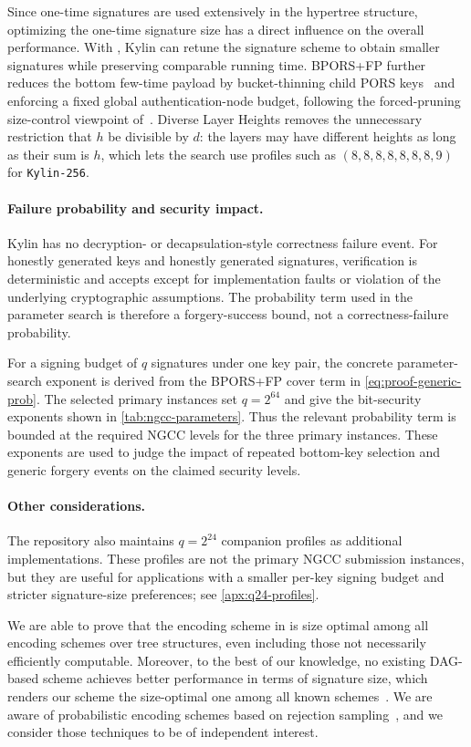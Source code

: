 Since one-time signatures are used extensively in the \SPHINCSP hypertree
structure, optimizing the one-time signature size has a direct influence on the
overall performance. With \WOTSCS, Kylin can retune the signature scheme to
obtain smaller signatures while preserving comparable running time. BPORS+FP
further reduces the bottom few-time payload by bucket-thinning child PORS
keys~\cite{bucketthinning} and enforcing a fixed global authentication-node
budget, following the forced-pruning size-control viewpoint
of~\cite{EPRINT:AbrKat25}. Diverse Layer Heights removes the unnecessary
restriction that $h$ be divisible by $d$: the layers may have different heights
as long as their sum is $h$, which lets the search use profiles such as
$(8,8,8,8,8,8,8,9)$ for \texttt{Kylin-256}.

\paragraph{Failure probability and security impact.}
Kylin has no decryption- or decapsulation-style correctness failure event. For honestly generated keys and honestly generated signatures, verification is deterministic and accepts except for implementation faults or violation of the underlying cryptographic assumptions. The probability term used in the parameter search is therefore a forgery-success bound, not a correctness-failure probability.

For a signing budget of $q$ signatures under one key pair, the concrete
parameter-search exponent is derived from the BPORS+FP cover term in
\cref{eq:proof-generic-prob}.  The selected primary instances set $q=2^{64}$
and give the bit-security exponents shown in \cref{tab:ngcc-parameters}. Thus
the relevant probability term is bounded at the required NGCC levels for the
three primary instances. These exponents are used to judge the impact of
repeated bottom-key selection and generic forgery events on the claimed
security levels.

\paragraph{Other considerations.}
The repository also maintains $q=2^{24}$ companion profiles as additional implementations. These profiles are not the primary NGCC submission instances, but they are useful for applications with a smaller per-key signing budget and stricter signature-size preferences; see \cref{apx:q24-profiles}.

We are able to prove that the encoding scheme in \WOTSCS is size optimal among all encoding schemes over tree structures, even including those not necessarily efficiently computable. Moreover, to the best of our knowledge, no existing DAG-based scheme achieves better performance in terms of signature size, which renders our scheme the size-optimal one among all known schemes~\cite{optimalwots}. We are aware of probabilistic encoding schemes based on rejection sampling~\cite{cryptoeprint:2022/778}, and we consider those techniques to be of independent interest.
